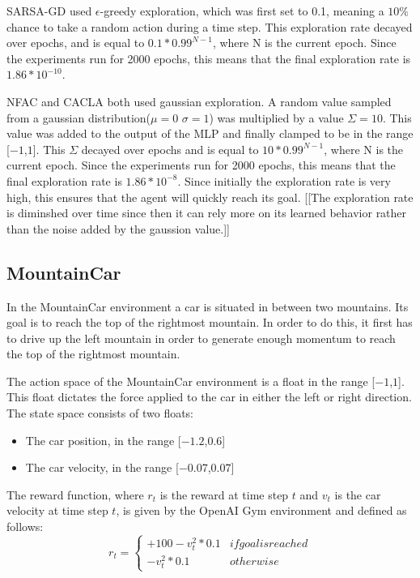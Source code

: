 SARSA-GD used $\epsilon$-greedy exploration, which was first set to 0.1, meaning a $10\%$ chance to take a random action during a time step. This exploration rate decayed over epochs, and is equal to $0.1 * 0.99^{N-1}$, where N is the current epoch. Since the experiments run for 2000 epochs, this means that the final exploration rate is $1.86*10^{-10}$.   

NFAC and CACLA both used gaussian exploration.  A random value sampled from a gaussian distribution($\mu=0$ $\sigma=1$) was multiplied by a value $\Sigma=10$. This value was added to the output of the MLP and finally clamped to be in the range [$-1$,$1$]. This $\Sigma$ decayed over epochs and is equal to  $10 * 0.99^{N-1}$, where N is the current epoch. Since the experiments run for 2000 epochs, this means that the final exploration rate is $1.86*10^{-8}$. Since initially the exploration rate is very high, this ensures that the agent will quickly reach its goal. [[The exploration rate is diminshed over time since then it can rely more on its learned behavior rather than the noise added by the gaussion value.]] 

\subsection{MountainCar}
In the MountainCar environment a car is situated in between two mountains. Its goal is to reach the top of the rightmost mountain. In order to do this, it first has to drive up the left mountain in order to generate enough momentum to reach the top of the rightmost mountain. 

The action space of the MountainCar environment is a float in the range [$-1$,$1$]. This float dictates the force applied to the car in either the left or right direction. The state space consists of two floats:
\begin{itemize}
    \item[] The car position, in the range [$-1.2$,$0.6$]
    \item[] The car velocity, in the range [$-0.07$,$0.07$]
\end{itemize}

The reward function, where $r_t$ is the reward at time step $t$ and $v_t$ is the car velocity at time step $t$, is given by the OpenAI Gym environment and defined as follows:
\begin{equation}
    r_t =
    \begin{cases*}
      +100 -v_t^2 * 0.1 & if goal is reached \\
      -v_t^2 * 0.1 & otherwise
    \end{cases*}
\end{equation}

